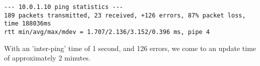 \begin{lstlisting}
--- 10.0.1.10 ping statistics ---
189 packets transmitted, 23 received, +126 errors, 87% packet loss, time 188036ms
rtt min/avg/max/mdev = 1.707/2.136/3.152/0.396 ms, pipe 4
\end{lstlisting}

With an 'inter-ping' time of 1 second, and 126 errors, we come to an update time of approximately 2 minutes.
